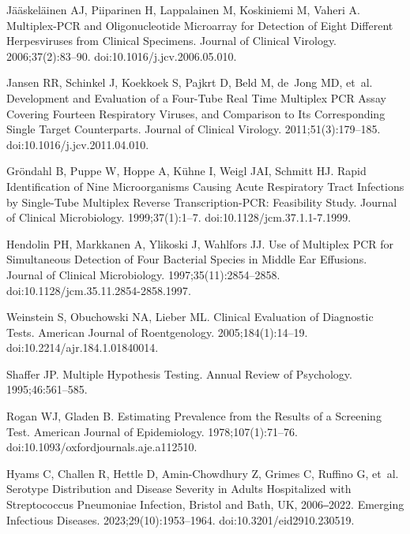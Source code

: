 \documentclass[10pt,letterpaper]{article}
\begin{document}
\begin{thebibliography}{10}
Jääskeläinen AJ, Piiparinen H, Lappalainen M, Koskiniemi M, Vaheri A.
\newblock Multiplex-{{PCR}} and Oligonucleotide Microarray for Detection of
  Eight Different Herpesviruses from Clinical Specimens.
\newblock Journal of Clinical Virology. 2006;37(2):83--90.
\newblock doi:{10.1016/j.jcv.2006.05.010}.

Jansen RR, Schinkel J, Koekkoek S, Pajkrt D, Beld M, de~Jong MD, et~al.
\newblock Development and Evaluation of a Four-Tube Real Time Multiplex {{PCR}}
  Assay Covering Fourteen Respiratory Viruses, and Comparison to Its
  Corresponding Single Target Counterparts.
\newblock Journal of Clinical Virology. 2011;51(3):179--185.
\newblock doi:{10.1016/j.jcv.2011.04.010}.

Gröndahl B, Puppe W, Hoppe A, Kühne I, Weigl JAI, Schmitt HJ.
\newblock Rapid {{Identification}} of {{Nine Microorganisms Causing Acute
  Respiratory Tract Infections}} by {{Single-Tube Multiplex Reverse
  Transcription-PCR}}: {{Feasibility Study}}.
\newblock Journal of Clinical Microbiology. 1999;37(1):1--7.
\newblock doi:{10.1128/jcm.37.1.1-7.1999}.

Hendolin PH, Markkanen A, Ylikoski J, Wahlfors JJ.
\newblock Use of Multiplex {{PCR}} for Simultaneous Detection of Four Bacterial
  Species in Middle Ear Effusions.
\newblock Journal of Clinical Microbiology. 1997;35(11):2854--2858.
\newblock doi:{10.1128/jcm.35.11.2854-2858.1997}.

Weinstein S, Obuchowski NA, Lieber ML.
\newblock Clinical {{Evaluation}} of {{Diagnostic Tests}}.
\newblock American Journal of Roentgenology. 2005;184(1):14--19.
\newblock doi:{10.2214/ajr.184.1.01840014}.

Shaffer JP.
\newblock Multiple Hypothesis Testing.
\newblock Annual Review of Psychology. 1995;46:561--585.

Rogan WJ, Gladen B.
\newblock Estimating Prevalence from the Results of a Screening Test.
\newblock American Journal of Epidemiology. 1978;107(1):71--76.
\newblock doi:{10.1093/oxfordjournals.aje.a112510}.

Hyams C, Challen R, Hettle D, {Amin-Chowdhury} Z, Grimes C, Ruffino G, et~al.
\newblock Serotype {{Distribution}} and {{Disease Severity}} in {{Adults
  Hospitalized}} with {{Streptococcus}} Pneumoniae {{Infection}}, {{Bristol}}
  and {{Bath}}, {{UK}}, 2006‒2022.
\newblock Emerging Infectious Diseases. 2023;29(10):1953--1964.
\newblock doi:{10.3201/eid2910.230519}.


\end{thebibliography}
\end{document}
